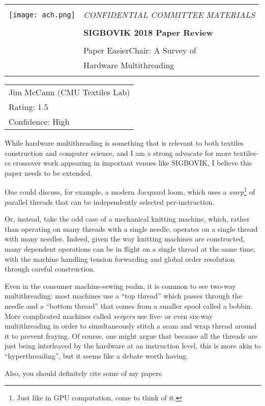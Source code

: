 \documentclass[12pt]{article}
\begin{document}
{\sffamily
\begin{tabular}{ll}
\multirow{3}{*}{\texttt{[image: ach.png]}}\\
& \Large{\em CONFIDENTIAL COMMITTEE MATERIALS} \\
&\\
& \textbf{\Huge{SIGBOVIK 2018 Paper Review}} \\
&\\
& \LARGE{Paper EasierChair: A Survey of} \\[0.25em]
& \LARGE{Hardware Multithreading} \\
&\\
\hline
\end{tabular}}
\vspace{2em}
\thispagestyle{empty}

{\large\bf
\begin{tabular}{l}
Jim McCann (CMU Textiles Lab)\\
Rating: 1.5 \\
Confidence: High \\
\end{tabular}}
\vspace{1em}

While hardware multithreading is something that is relevant to both textiles construction and computer science, and I am a strong advocate for more textiles-cs crossover work appearing in important venues like SIGBOVIK, I believe this paper needs to be extended.

One could discuss, for example, a modern Jacquard loom, which uses a {\em warp}\footnote{Just like in GPU computation, come to think of it.} of parallel threads that can be independently selected per-instruction.

Or, instead, take the odd case of a mechanical knitting machine, which, rather than operating on many threads with a single needle, operates on a single thread with many needles.
Indeed, given the way knitting machines are constructed, many dependent operations can be in flight on a single thread at the same time,
with the machine handling tension forwarding and global order resolution through careful construction.

Even in the consumer machine-sewing realm, it is common to see two-way multithreading:
most machines use a ``top thread'' which passes through the needle and a ``bottom thread'' that comes from a smaller spool called a bobbin.
More complicated machines called {\em sergers} use five- or even six-way multithreading in order to simultaneously stitch a seam and wrap thread around it to prevent fraying.
Of course, one might argue that because all the threads are just being interleaved by the hardware at an instruction level, this is more akin to ``hyperthreading'', but it seems like a debate worth having.


Also, you should definitely cite some of my papers.
\end{document}
